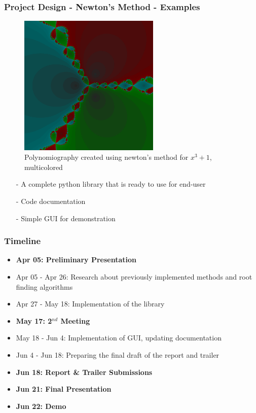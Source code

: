 \documentclass{beamer}
\begin{document}
\begin{contents}
        \frametitle{{\color{white} Project Design - Newton's Method - Examples}}
	\begin{figure}[h]
		\centering
		\caption{Polynomiography created using newton's method for $x^3 + 1$, multicolored}
		\includegraphics[width=0.6\textwidth]{fig5}
	\end{figure}
\end{contents}

\begin{projectrequirements}
\begin{itemize}
    \item[-] A complete python library that is ready to use for end-user
    \item[-] Code documentation
    \item[-] Simple GUI for demonstration
\end{itemize}
\end{projectrequirements}

\begin{contents}
	\frametitle{{\color{white} Timeline}}
	\begin{itemize}
	    \item \textbf{Apr 05: Preliminary Presentation}
	    \item Apr 05 - Apr 26: Research about previously implemented methods and root finding algorithms
	    \item Apr 27 - May 18: Implementation of the library
	    \item \textbf{May 17: 2$^{nd}$ Meeting}
	    \item May 18 - Jun 4: Implementation of GUI, updating documentation
            \item Jun 4 - Jun 18: Preparing the final draft of the report and trailer
	    \item \textbf{Jun 18: Report & Trailer Submissions}
	    \item \textbf{Jun 21: Final Presentation}
	    \item \textbf{Jun 22: Demo}
	\end{itemize}
\end{contents}
\end{document}
